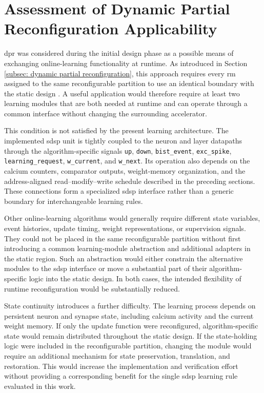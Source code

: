 \section{Assessment of Dynamic Partial Reconfiguration Applicability}
\label{subsec:dpr-applicability}

\Gls{dpr} was considered during the initial design phase as a possible means of exchanging online-learning functionality at runtime. As introduced in Section \ref{subsec: dynamic partial reconfiguration}, this approach requires every \gls{rm} assigned to the same reconfigurable partition to use an identical boundary with the static design \cite{UG909}. A useful application would therefore require at least two learning modules that are both needed at runtime and can operate through a common interface without changing the surrounding accelerator.

This condition is not satisfied by the present learning architecture. The implemented \gls{sdsp} unit is tightly coupled to the neuron and layer datapaths through the algorithm-specific signals \texttt{up}, \texttt{down}, \texttt{bist\_event}, \texttt{exc\_spike}, \texttt{learning\_request}, \texttt{w\_current}, and \texttt{w\_next}. Its operation also depends on the calcium counters, comparator outputs, weight-memory organization, and the address-aligned read--modify--write schedule described in the preceding sections. These connections form a specialized \gls{sdsp} interface rather than a generic boundary for interchangeable learning rules.

Other online-learning algorithms would generally require different state variables, event histories, update timing, weight representations, or supervision signals. They could not be placed in the same reconfigurable partition without first introducing a common learning-module abstraction and additional adapters in the static region. Such an abstraction would either constrain the alternative modules to the \gls{sdsp} interface or move a substantial part of their algorithm-specific logic into the static design. In both cases, the intended flexibility of runtime reconfiguration would be substantially reduced.

State continuity introduces a further difficulty. The learning process depends on persistent neuron and synapse state, including calcium activity and the current weight memory. If only the update function were reconfigured, algorithm-specific state would remain distributed throughout the static design. If the state-holding logic were included in the reconfigurable partition, changing the module would require an additional mechanism for state preservation, translation, and restoration. This would increase the implementation and verification effort without providing a corresponding benefit for the single \gls{sdsp} learning rule evaluated in this work.

